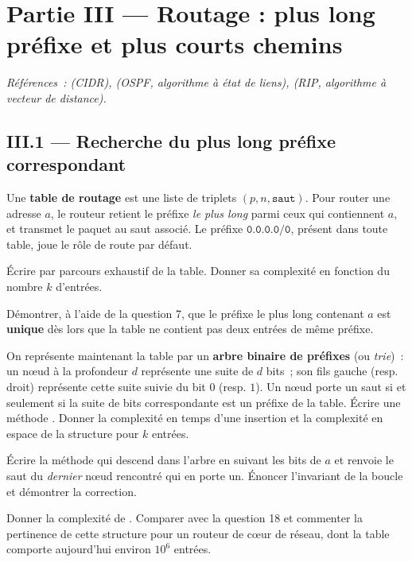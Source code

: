 \documentclass[11pt,a4paper]{article}
\begin{document}
\section*{Partie III --- Routage : plus long préfixe et plus courts chemins}

\emph{Références~:  (CIDR),  (OSPF, algorithme à état de liens),
 (RIP, algorithme à vecteur de distance).}

\subsection*{III.1 --- Recherche du plus long préfixe correspondant}

Une \textbf{table de routage} est une liste de triplets $(p,n,\texttt{saut})$. Pour router
une adresse $a$, le routeur retient le préfixe \emph{le plus long} parmi ceux qui contiennent
$a$, et transmet le paquet au saut associé. Le préfixe $\texttt{0.0.0.0/0}$, présent dans
toute table, joue le rôle de route par défaut.

\Q Écrire  par parcours exhaustif de la table. Donner sa
complexité en fonction du nombre $k$ d'entrées.

\Q Démontrer, à l'aide de la question 7, que le préfixe le plus long contenant $a$ est
\textbf{unique} dès lors que la table ne contient pas deux entrées de même préfixe.

\Q On représente maintenant la table par un \textbf{arbre binaire de préfixes} (ou
\emph{trie})~: un n\oe ud à la profondeur $d$ représente une suite de $d$ bits~; son fils
gauche (resp. droit) représente cette suite suivie du bit $0$ (resp. $1$). Un n\oe ud porte
un saut si et seulement si la suite de bits correspondante est un préfixe de la table.
Écrire une méthode . Donner la complexité en temps d'une insertion
et la complexité en espace de la structure pour $k$ entrées.

\Q Écrire la méthode  qui descend dans l'arbre en suivant les bits de $a$
et renvoie le saut du \emph{dernier} n\oe ud rencontré qui en porte un. Énoncer l'invariant
de la boucle et démontrer la correction.

\Q Donner la complexité de . Comparer avec la question 18 et commenter la
pertinence de cette structure pour un routeur de c\oe ur de réseau, dont la table comporte
aujourd'hui environ $10^6$ entrées.
\end{document}
